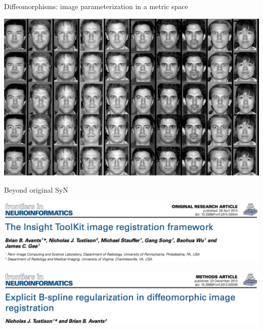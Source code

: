 \documentclass[ignorenonframetext,]{beamer}
\begin{document}
\begin{frame}{Diffeomorphisms: image parameterization in a metric space}

\includegraphics{./figures/shape_appearance.png}

\end{frame}

\begin{frame}{Beyond original SyN}

\small

\includegraphics{./papers/figures/Frontiers_ITK.png}

\includegraphics{./papers/figures/Frontiers_BSplineSyN.png}

\end{frame}
\end{document}
